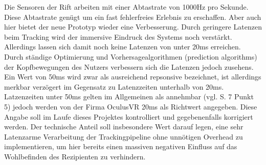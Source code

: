 \documentclass[pagesize, paper=a4, fontsize=12pt,titlepage=true, headings=small, headnosepline, abstractoff, liststotoc, nochapterprefix, plainheadsepline, twoside]{scrreprt}
\begin{document}
Die Sensoren der Rift arbeiten mit einer Abtastrate von 1000Hz pro Sekunde. Diese Abtastrate genügt um ein fast fehlerfreies Erlebnis zu erschaffen. Aber auch hier bietet der neue Prototyp wieder eine Verbesserung. Durch geringere Latenzen beim Tracking wird der immersive Eindruck des Systems noch verstärkt. Allerdings lassen sich damit noch keine Latenzen von unter 20ms erreichen. Durch ständige Optimierung und Vorhersagealgorithmen (prediction algorithms) der Kopfbewegungen des Nutzers verbessern sich die Latenzen jedoch zusehens. Ein Wert von 50ms wird zwar als ausreichend repsonsive bezeichnet, ist allerdings merkbar verzögert im Gegensatz zu  Latenzzeiten unterhalb von 20ms. Latzenzeiten unter 50ms gelten im Allgemeinen als annehmbar (vgl. \cite{MeRazWhitBro2003} S. 7 Punkt 5) jedoch werden von der Firma OculusVR 20ms als Richtwert angegeben. Diese Angabe soll im Laufe dieses Projektes kontrolliert und gegebenenfalls korrigiert werden. Der technische Anteil soll insbesondere Wert darauf legen, eine sehr Latenzarme Verarbeitung der Trackingpipeline ohne unnötigen Overhead zu implementieren, um hier bereits einen massiven negativen Einfluss auf das Wohlbefinden des Rezipienten zu verhindern.
\end{document}
